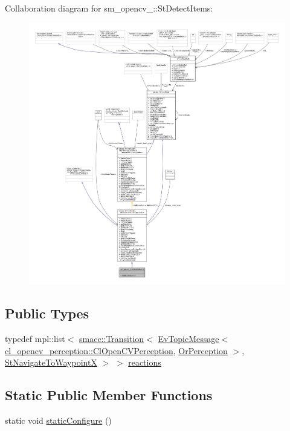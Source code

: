 Collaboration diagram for sm\+\_\+opencv\+\_\+:\+:St\+Detect\+Items\+:
\nopagebreak
\begin{figure}[H]
\begin{center}
\leavevmode
\includegraphics[width=350pt]{structsm__opencv__2_1_1StDetectItems__coll__graph}
\end{center}
\end{figure}
\subsection*{Public Types}
\begin{DoxyCompactItemize}
\item 
typedef mpl\+::list$<$ \hyperlink{classsmacc_1_1Transition}{smacc\+::\+Transition}$<$ \hyperlink{structsmacc_1_1default__events_1_1EvTopicMessage}{Ev\+Topic\+Message}$<$ \hyperlink{classsm__opencv__2_1_1cl__opencv__perception_1_1ClOpenCVPerception}{cl\+\_\+opencv\+\_\+perception\+::\+Cl\+Open\+C\+V\+Perception}, \hyperlink{classsm__opencv__2_1_1OrPerception}{Or\+Perception} $>$, \hyperlink{structsm__opencv__2_1_1StNavigateToWaypointX}{St\+Navigate\+To\+WaypointX} $>$ $>$ \hyperlink{structsm__opencv__2_1_1StDetectItems_aed8ddb8e7461e292b4f64d3540c24a7c}{reactions}
\end{DoxyCompactItemize}
\subsection*{Static Public Member Functions}
\begin{DoxyCompactItemize}
\item 
static void \hyperlink{structsm__opencv__2_1_1StDetectItems_a7a463d0d107e69ea1e1e77d806218fde}{static\+Configure} ()
\end{DoxyCompactItemize}
